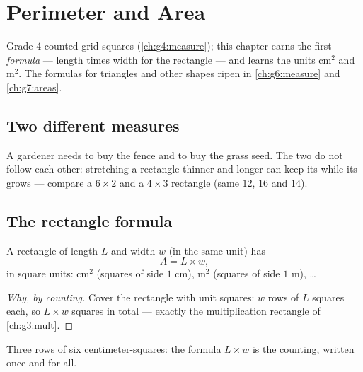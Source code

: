 \chapter{Perimeter and Area}\label{ch:g5:areas}

Grade 4 counted grid squares (\cref{ch:g4:measure}); this chapter
earns the first  \emph{formula} --- length times width for the
rectangle --- and learns the units cm$^2$ and m$^2$. The formulas for
triangles and other shapes ripen in \cref{ch:g6:measure} and
\cref{ch:g7:areas}.

\section{Two different measures}

\begin{example}\label{ex:g5:areas:contrast}
A gardener needs \emph{} to buy the fence and \emph{}
to buy the grass seed. The two do not follow each other: stretching
a rectangle thinner and longer can keep its  while its 
grows --- compare a $6 \times 2$ and a $4 \times 3$ rectangle
(same  $12$,  $16$ and $14$).
\end{example}

\section{The rectangle formula}

\begin{proposition}\label{prop:g5:areas:rectangle}
A rectangle of length $L$ and width $w$ (in the same unit) has 
\[
A = L \times w ,
\]
in square units: cm$^2$ (squares of side $1$ cm), m$^2$ (squares of
side $1$ m), \dots
\end{proposition}

\begin{proof}[Why, by counting]
Cover the rectangle with unit squares: $w$ rows of $L$ squares each,
so $L \times w$ squares in total --- exactly the multiplication
rectangle of \cref{ch:g3:mult}.
\end{proof}

\begin{omfigure}

{\small Three rows of six centimeter-squares: the formula
$L \times w$ is the counting, written once and for all.}
\end{omfigure}

